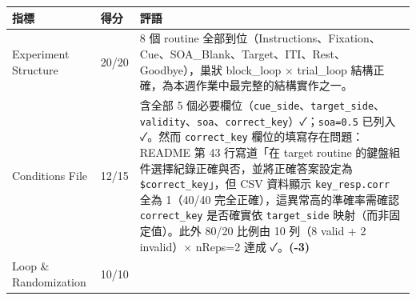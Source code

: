 \documentclass[14pt,]{extarticle}
\begin{document}
\begin{longtable}[]{@{}lll@{}}
\toprule
\begin{minipage}[b]{0.09\columnwidth}\raggedright
指標\strut
\end{minipage} & \begin{minipage}[b]{0.09\columnwidth}\raggedright
得分\strut
\end{minipage} & \begin{minipage}[b]{0.09\columnwidth}\raggedright
評語\strut
\end{minipage}\tabularnewline
\midrule
\endhead
\begin{minipage}[t]{0.09\columnwidth}\raggedright
Experiment Structure\strut
\end{minipage} & \begin{minipage}[t]{0.09\columnwidth}\raggedright
20/20\strut
\end{minipage} & \begin{minipage}[t]{0.09\columnwidth}\raggedright
8 個 routine
全部到位（Instructions、Fixation、Cue、SOA\_Blank、Target、ITI、Rest、Goodbye），巢狀
block\_loop × trial\_loop
結構正確，為本週作業中最完整的結構實作之一。\strut
\end{minipage}\tabularnewline
\begin{minipage}[t]{0.09\columnwidth}\raggedright
Conditions File\strut
\end{minipage} & \begin{minipage}[t]{0.09\columnwidth}\raggedright
12/15\strut
\end{minipage} & \begin{minipage}[t]{0.09\columnwidth}\raggedright
含全部 5
個必要欄位（\texttt{cue\_side}、\texttt{target\_side}、\texttt{validity}、\texttt{soa}、\texttt{correct\_key}）✓；\texttt{soa=0.5}
已列入 ✓。然而 \texttt{correct\_key} 欄位的填寫存在問題：README 第 43
行寫道「在 target routine 的鍵盤組件選擇紀錄正確與否，並將正確答案設定為
\texttt{\$correct\_key}」，但 CSV 資料顯示 \texttt{key\_resp.corr} 全為
1（40/40 完全正確），這異常高的準確率需確認 \texttt{correct\_key}
是否確實依 \texttt{target\_side} 映射（而非固定值）。此外 80/20 比例由
10 列（8 valid + 2 invalid）× nReps=2 達成 ✓。\textbf{(-3)}\strut
\end{minipage}\tabularnewline
\begin{minipage}[t]{0.09\columnwidth}\raggedright
Loop \& Randomization\strut
\end{minipage} & \begin{minipage}[t]{0.09\columnwidth}\raggedright
10/10\strut
\end{minipage} & \begin{minipage}[t]{0.09\columnwidth}\raggedright

\end{minipage}
\end{longtable}
\end{document}
